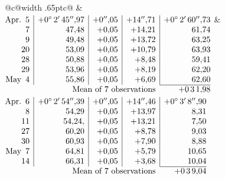 \noindent\begin{tabular}{@{}c@{\hspace{.4em}\vrule width .65pt\hspace{.4em}}c@{}}
 &
 \\[.18ex]
\(\begin{array}[t]{@{}r|r|r|r|r@{}}
\text{Apr.}\enspace 5 & +0^\circ\,2'\,45''{,}97 & +0''{,}05 & +14''{,}71 & +0^\circ\,2'\,60''{,}73\\
7 & 47{,}48 & +0{,}05 & +14{,}21 & 61{,}74\\
9 & 49{,}48 & +0{,}05 & +13{,}72 & 63{,}25\\
20 & 53{,}09 & +0{,}05 & +10{,}79 & 63{,}93\\
28 & 50{,}88 & +0{,}05 & +8{,}48 & 59{,}41\\
29 & 53{,}96 & +0{,}05 & +8{,}19 & 62{,}20\\
\text{May}\enspace 4 & 55{,}86 & +0{,}05 & +6{,}69 & 62{,}60\\
\cline{5-5}
\multicolumn{4}{r}{\text{Mean of 7 observations}} & +0\,3\,1{,}98
\end{array}\)
&
\(\begin{array}[t]{@{}r|r|r|r|r@{}}
\text{Apr.}\enspace 6 & +0^\circ\,2'\,54''{,}39 & +0''{,}05 & +14''{,}46 & +0^\circ\,3'\,8''{,}90\\
8 & 54{,}29 & +0{,}05 & +13{,}97 & 8{,}31\\
11 & 54{,}24{,} & +0{,}05 & +13{,}21 & 7{,}50\\
27 & 60{,}20 & +0{,}05 & +8{,}78 & 9{,}03\\
30 & 60{,}93 & +0{,}05 & +7{,}90 & 8{,}88\\
\text{May}\enspace 7 & 64{,}81 & +0{,}05 & +5{,}79 & 10{,}65\\
14 & 66{,}31 & +0{,}05 & +3{,}68 & 10{,}04\\
\cline{5-5}
\multicolumn{4}{r}{\text{Mean of 7 observations}} & +0\,3\,9{,}04
\end{array}\)
\end{tabular}\par\medskip
